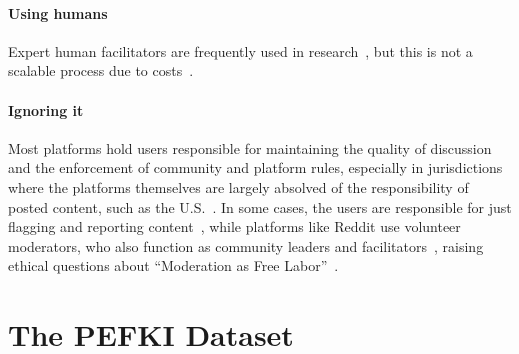 \documentclass[11pt]{article}
\theoremstyle{definition}
\theoremstyle{plain}
\begin{document}
\paragraph{Using humans} 
Expert human facilitators are frequently used in research~\citep{chen-etal-2025-whow, ceri, schroeder-etal-2024-fora}, but this is not a scalable process due to costs~\citep{Rossi_Harrison_Shklovski_2024}.

\paragraph{Ignoring it}
Most platforms hold users responsible for maintaining the quality of discussion and the enforcement of community and platform rules, especially in jurisdictions where the platforms themselves are largely absolved of the responsibility of posted content, such as the U.S.~\citep{seering_2020_selfmoderation, schaffner_community_guidelines}. In some cases, the users are responsible for just flagging and reporting content~\citep{seering_2020_selfmoderation}, while platforms like Reddit use volunteer moderators, who also function as community leaders and facilitators~\citep{seering_2020_selfmoderation, umod}, raising ethical questions about ``Moderation as Free Labor''~\citep{Matias2019TheCL}.


\section{The PEFKI Dataset}
\label{sec:dataset}
\end{document}
